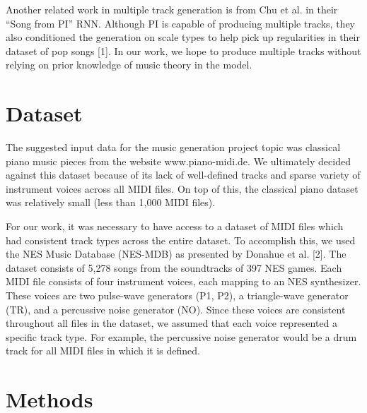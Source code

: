 \documentclass{article}
\begin{document}
Another related work in multiple track generation is from Chu et al. in their “Song from PI” RNN. Although PI is capable of producing multiple tracks, they also conditioned the generation on scale types to help pick up regularities in their dataset of pop songs [1]. In our work, we hope to produce multiple tracks without relying on prior knowledge of music theory in the model.


\section{Dataset}

The suggested input data for the music generation project topic was classical piano music pieces from the website www.piano-midi.de. We ultimately decided against this dataset because of its lack of well-defined tracks and sparse variety of instrument voices across all MIDI files. On top of this, the classical piano dataset was relatively small (less than 1,000 MIDI files).


For our work, it was necessary to have access to a dataset of MIDI files which had consistent track types across the entire dataset. To accomplish this, we used the NES Music Database (NES-MDB) as presented by Donahue et al. [2]. The dataset consists of 5,278 songs from the soundtracks of 397 NES games. Each MIDI file consists of four instrument voices, each mapping to an NES synthesizer. These voices are two pulse-wave generators (P1, P2), a triangle-wave generator (TR), and a percussive noise generator (NO). Since these voices are consistent throughout all files in the dataset, we assumed that each voice represented a specific track type. For example, the percussive noise generator would be a drum track for all MIDI files in which it is defined.



\section{Methods}

\end{document}
